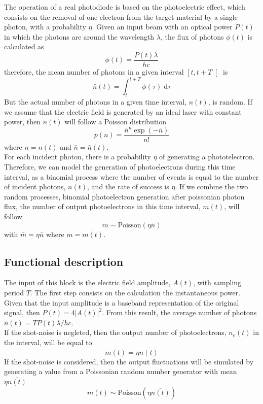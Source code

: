 The operation of a real photodiode is based on the photoelectric effect, which consists on the removal of one electron from the target material by a single photon, with a probability $\eta$.
Given an input beam with an optical power $P(t)$ in which the photons are around the wavelength $\lambda$, the flux of photons $\phi(t)$ is calculated as
\cite{saleh1991}
%
\begin{equation}
	\phi(t) = \frac{P(t) \lambda}{hc}
\end{equation}
therefore, the mean number of photons in a given interval $\left[ t, t+T \right[$ is
\begin{equation}
	\bar{n}(t) = \int_{t}^{t+T} \phi(\tau) \; \textrm{d}\tau
\end{equation}
%
But the actual number of photons in a given time interval, $n(t)$, is random. If we assume that the electric field is generated by an ideal laser with constant power, then $n(t)$ will follow a Poisson distribution
%
\begin{equation}
	p\left( n \right) = \frac{ \bar{n}^n \exp(-\bar{n})}{n!}
\end{equation}
%
where $n=n(t)$ and $\bar{n} = \bar{n}(t)$.
\\
For each incident photon, there is a probability $\eta$ of generating a phototelectron.
Therefore, we can model the generation of photoelectrons during this time interval, as a binomial process where the number of events is equal to the number of incident photons, $n(t)$, and the rate of success is $\eta$.
If we combine the two random processes, binomial photoelectron generation after poissonian photon flux, the number of output photoelectrons in this time interval, $m(t)$, will follow
\cite{saleh1991}
%
\begin{equation}
	m \sim \textrm{Poisson}\left(\eta \bar{n} \right)
	\label{eq:electron_number_distribution}
\end{equation}
%
with $\bar{m} = \eta \bar{n}$ where $m = m(t)$.
%
%
%
%
\subsection*{Functional description}
%
The input of this block is the electric field amplitude, $A(t)$, with sampling period $T$.
The first step consists on the calculation the instantaneous power.
Given that the input amplitude is a baseband representation of the original signal, then $P(t) = 4 |A(t)|^2$.
From this result, the average number of photons $\bar{n}(t) = T P(t) \lambda / h c$.\\
If the shot-noise is negleted, then the output number of photoelectrons, $n_e(t)$ in the interval, will be equal to
%
\begin{equation}
	m(t) = \eta \overline{n(t)}
\end{equation}
%
If the shot-noise is considered, then the output fluctuations will be simulated by generating a value from a Poissonian random number generator with mean $\eta \overline{n(t)}$
\begin{equation}
	m(t) \sim \textrm{Poisson}\left(\eta \overline{n(t)} \right)
\end{equation}

